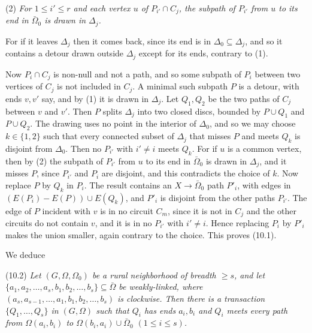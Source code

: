 {\hspace*{12pt}(2) \textit{For $1 \le i' \le r$ and each vertex $u$ of $P_{i'} \cap C_j$, the subpath
of $P_{i'}$ from $u$ to its end in $\bar{\Omega}_0$ is drawn in $\Delta_j$.}

For if it leaves $\Delta_j$ then it comes back, since its end is in $\Delta_0 \subseteq \Delta_j$, and
so it contains a detour drawn outside $\Delta_j$ except for its ends, contrary to (1).

Now $P_i \cap C_j$ is non-null and not a path, and so some subpath of $P_i$ between two vertices of
$C_j$ is not included in $C_j$. A minimal such subpath $P$ is a detour, with ends $v, v'$ say, and by
(1) it is drawn in $\Delta_j$. Let $Q_1, Q_2$ be the two paths of $C_j$ between $v$ and $v'$. Then $P$
splits $\Delta_j$ into two closed discs, bounded by $P \cup Q_1$ and $P \cup Q_2$. The drawing uses no
point in the interior of $\Delta_0$, and so we may choose $k \in \{1, 2\}$ such that every connected
subset of $\Delta_j$ that misses $P$ and meets $Q_k$ is disjoint from $\Delta_0$. Then no $P_{i'}$
with $i' \ne i$ meets $Q_k$. For if $u$ is a common vertex, then by (2) the subpath of $P_{i'}$ from
$u$ to its end in $\bar{\Omega}_0$ is drawn in $\Delta_j$, and it misses $P$, since $P_{i'}$ and $P_i$
are disjoint, and this contradicts the choice of $k$. Now replace $P$ by $Q_k$ in $P_i$. The result
contains an $X \to \bar{\Omega}_0$ path $P'_i$, with edges in $(E(P_i) - E(P)) \cup E(Q_k)$, and
$P'_i$ is disjoint from the other paths $P_{i'}$. The edge of $P$ incident with $v$ is in no circuit
$C_m$, since it is not in $C_j$ and the other circuits do not contain $v$, and it is in no $P_{i'}$
with $i' \ne i$.
Hence replacing $P_i$ by $P'_i$ makes the union smaller, again contrary to the choice. This
proves (10.1).}

We deduce

\stmt
(10.2) \textit{Let $(G, \Omega, \Omega_0)$ be a rural neighborhood of breadth $\ge s$, and let $\{a_1, a_2, \dots, a_s, b_1, b_2, \dots, b_s\} \subseteq \bar{\Omega}$ be weakly-linked, where $(a_s, a_{s-1}, \dots, a_1, b_1, b_2, \dots, b_s)$ is clockwise. Then there is a transaction $\{Q_1, \dots, Q_s\}$ in $(G, \Omega)$ such that $Q_i$ has ends $a_i, b_i$ and $Q_i$ meets every path from $\Omega(a_i, b_i)$ to $\Omega(b_i, a_i) \cup \bar{\Omega}_0$ $(1 \le i \le s)$.}

